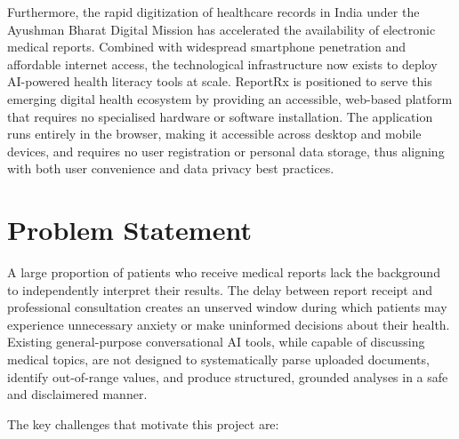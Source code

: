 Furthermore, the rapid digitization of healthcare records in India under the Ayushman Bharat Digital Mission has accelerated the availability of electronic medical reports. Combined with widespread smartphone penetration and affordable internet access, the technological infrastructure now exists to deploy AI-powered health literacy tools at scale. ReportRx is positioned to serve this emerging digital health ecosystem by providing an accessible, web-based platform that requires no specialised hardware or software installation. The application runs entirely in the browser, making it accessible across desktop and mobile devices, and requires no user registration or personal data storage, thus aligning with both user convenience and data privacy best practices.

\section{Problem Statement}
A large proportion of patients who receive medical reports lack the background to independently interpret their results. The delay between report receipt and professional consultation creates an unserved window during which patients may experience unnecessary anxiety or make uninformed decisions about their health. Existing general-purpose conversational AI tools, while capable of discussing medical topics, are not designed to systematically parse uploaded documents, identify out-of-range values, and produce structured, grounded analyses in a safe and disclaimered manner.

The key challenges that motivate this project are:

